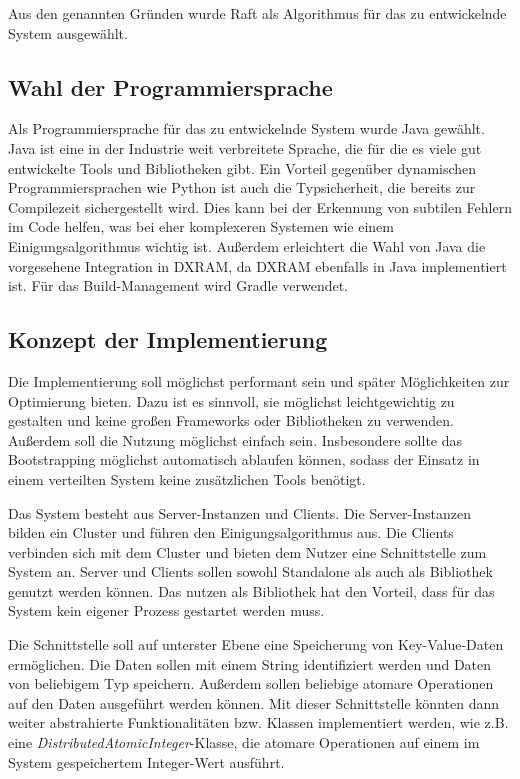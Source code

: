 Aus den genannten Gründen wurde Raft als Algorithmus für das zu entwickelnde System ausgewählt.

\subsection{Wahl der Programmiersprache}
 \label{sprache}

Als Programmiersprache für das zu entwickelnde System wurde Java gewählt. Java ist eine in der Industrie weit verbreitete Sprache, die für die es viele gut entwickelte Tools und Bibliotheken gibt. Ein Vorteil gegenüber dynamischen Programmiersprachen wie Python ist auch die Typsicherheit, die bereits zur Compilezeit sichergestellt wird. Dies kann bei der Erkennung von subtilen Fehlern im Code helfen, was bei eher komplexeren Systemen wie einem Einigungsalgorithmus wichtig ist. Außerdem erleichtert die Wahl von Java die vorgesehene Integration in DXRAM, da DXRAM ebenfalls in Java implementiert ist. Für das Build-Management wird Gradle verwendet.

\subsection{Konzept der Implementierung}
 \label{konzept}
 
Die Implementierung soll möglichst performant sein und später Möglichkeiten zur Optimierung bieten. Dazu ist es sinnvoll, sie möglichst leichtgewichtig zu gestalten und keine großen Frameworks oder Bibliotheken zu verwenden. Außerdem soll die Nutzung möglichst einfach sein. Insbesondere sollte das Bootstrapping möglichst automatisch ablaufen können, sodass der Einsatz in einem verteilten System keine zusätzlichen Tools benötigt.

Das System besteht aus Server-Instanzen und Clients. Die Server-Instanzen bilden ein Cluster und führen den Einigungsalgorithmus aus. Die Clients verbinden sich mit dem Cluster und bieten dem Nutzer eine Schnittstelle zum System an. Server und Clients sollen sowohl Standalone als auch als Bibliothek genutzt werden können. Das nutzen als Bibliothek hat den Vorteil, dass für das System kein eigener Prozess gestartet werden muss.

Die Schnittstelle soll auf unterster Ebene eine Speicherung von Key-Value-Daten ermöglichen. Die Daten sollen mit einem String identifiziert werden und Daten von beliebigem Typ speichern. Außerdem sollen beliebige atomare Operationen auf den Daten ausgeführt werden können. Mit dieser Schnittstelle könnten dann weiter abstrahierte Funktionalitäten bzw. Klassen implementiert werden, wie z.B. eine \textit{DistributedAtomicInteger}-Klasse, die atomare Operationen auf einem im System gespeichertem Integer-Wert ausführt.

